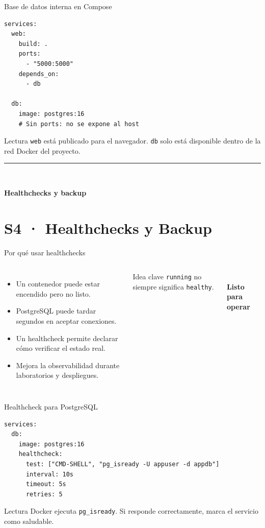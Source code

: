 \documentclass[aspectratio=169]{beamer}
\newcommand{\MainHeaderSlide}[2]{%
  \begingroup
  \setbeamercolor{background canvas}{bg=white}
  \begin{frame}[plain]
    \vfill
    \hspace*{0.9cm}%
    \begin{minipage}{0.78\paperwidth}
      {\color{UUblack}\rule{4cm}{1.3pt}}\\[14pt]
      {\raggedright\color{UUblack}\fontsize{36}{42}\selectfont\rmfamily\bfseries #1\par}
    \end{minipage}
    \vfill
  \end{frame}
  \endgroup
}
\begin{document}
\begin{frame}[fragile]{Base de datos interna en Compose}
\begin{lstlisting}[style=terminal, basicstyle=\ttfamily\scriptsize]
services:
  web:
    build: .
    ports:
      - "5000:5000"
    depends_on:
      - db

  db:
    image: postgres:16
    # Sin ports: no se expone al host
\end{lstlisting}
  \begin{block}{Lectura}
    \texttt{web} está publicado para el navegador. \texttt{db} solo está disponible dentro de la red Docker del proyecto.
  \end{block}
\end{frame}

\MainHeaderSlide{Healthchecks y backup}{Validar, respaldar y restaurar datos}
\section{S4 · Healthchecks y Backup}

\begin{frame}{Por qué usar healthchecks}
  \begin{columns}[c]
    \small
    \begin{itemize}
      \item Un contenedor puede estar encendido pero no listo.
      \item PostgreSQL puede tardar segundos en aceptar conexiones.
      \item Un healthcheck permite declarar cómo verificar el estado real.
      \item Mejora la observabilidad durante laboratorios y despliegues.
    \end{itemize}
    \begin{alertblock}{Idea clave}
      \texttt{running} no siempre significa \texttt{healthy}.
    \end{alertblock}
    \centering
    {\color{UUgreen}\fontsize{46}{52}\selectfont\faHeartbeat}\\[0.15cm]
    {\large\textbf{Listo para operar}}
  \end{columns}
\end{frame}

\begin{frame}[fragile]{Healthcheck para PostgreSQL}
\begin{lstlisting}[style=terminal, basicstyle=\ttfamily\scriptsize]
services:
  db:
    image: postgres:16
    healthcheck:
      test: ["CMD-SHELL", "pg_isready -U appuser -d appdb"]
      interval: 10s
      timeout: 5s
      retries: 5
\end{lstlisting}
  \begin{block}{Lectura}
    Docker ejecuta \texttt{pg\_isready}. Si responde correctamente, marca el servicio como saludable.
  \end{block}
\end{frame}
\end{document}
